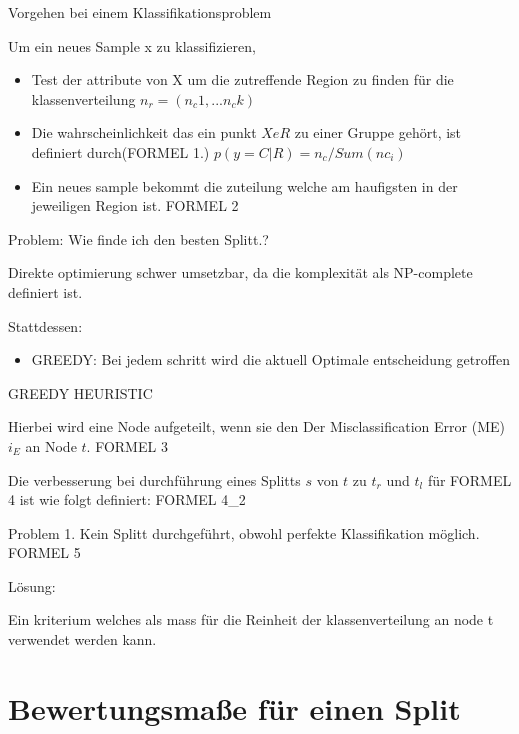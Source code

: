 \documentclass{beamer}
\begin{document}
\begin{frame}{Vorgehen bei einem Klassifikationsproblem}

Um ein neues Sample x zu klassifizieren,
\begin{itemize}
		\item {Test der attribute von X um die zutreffende Region zu finden für die klassenverteilung $n_r = (n_c1,...n_ck)$}
		\item {Die wahrscheinlichkeit das ein punkt $XeR$ zu einer Gruppe gehört, ist definiert durch(FORMEL 1.) $p(y=C|R)=n_c/Sum(nc_i)$}
		\item {Ein neues sample bekommt die zuteilung welche am haufigsten in der jeweiligen Region ist. FORMEL 2}
		
	\end{itemize}
Problem:
Wie finde ich den besten Splitt.? 

Direkte optimierung schwer umsetzbar, da die komplexität als NP-complete definiert ist. 

Stattdessen:

\begin{itemize}
		\item {GREEDY: Bei jedem schritt wird die aktuell Optimale entscheidung getroffen}
	\end{itemize}

\end{frame}


\begin{frame}{GREEDY HEURISTIC}

Hierbei wird eine Node aufgeteilt, wenn sie den Der Misclassification Error (ME) $i_E$ an Node $t$.
    FORMEL 3

Die verbesserung bei durchführung eines Splitts $s$ von $t$ zu $t_r$ und $t_l$ für 
     FORMEL 4 ist wie folgt definiert: FORMEL 4_2


Problem 1.
    Kein Splitt durchgeführt, obwohl perfekte Klassifikation möglich.
        FORMEL 5

Lösung: 

Ein kriterium welches als mass für die Reinheit der klassenverteilung an node t verwendet werden kann.
    
\end{frame}


\section{Bewertungsmaße für einen Split}
\end{document}
